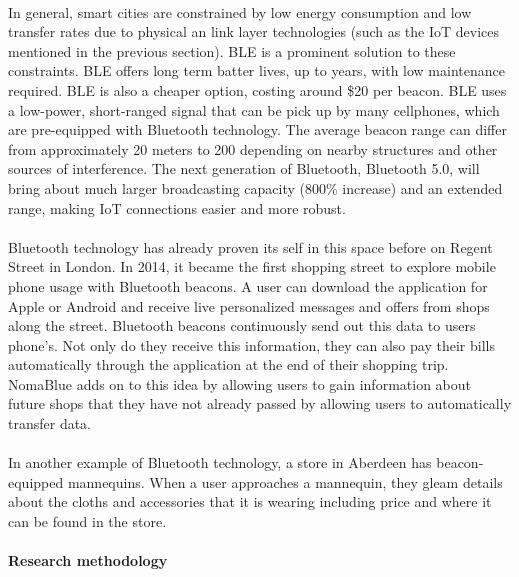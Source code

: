 \documentclass[a4paper,12pt]{article}
\begin{document}
\paragraph{}
In general, smart cities are constrained by low energy consumption and low transfer rates due to physical an link layer technologies (such as the IoT devices mentioned in the previous section). BLE is a prominent solution to these constraints. BLE offers long term batter lives, up to years, with low maintenance required. BLE is also a cheaper option, costing around \$20 per beacon. BLE uses a low-power, short-ranged signal that can be pick up by many cellphones, which are pre-equipped with Bluetooth technology. The average beacon range can differ from approximately 20 meters to 200 depending on nearby structures and other sources of interference. The next generation of Bluetooth, Bluetooth 5.0, will bring about much larger broadcasting capacity (800\% increase) and an extended range, making IoT connections easier and more robust.
\paragraph{}
Bluetooth technology has already proven its self in this space before on Regent Street in London. In 2014, it became the first shopping street to explore mobile phone usage with Bluetooth beacons. A user can download the application for Apple or Android and receive live personalized messages and offers from shops along the street. Bluetooth beacons continuously send out this data to users phone's. Not only do they receive this information, they can also pay their bills automatically through the application at the end of their shopping trip. NomaBlue adds on to this idea by allowing users to gain information about future shops that they have not already passed by allowing users to automatically transfer data.
\paragraph{}
In another example of Bluetooth technology, a store in Aberdeen has beacon-equipped mannequins. When a user approaches a mannequin, they gleam details about the cloths and accessories that it is wearing including price and where it can be found in the store.
\paragraph{Research methodology}












\medskip
\newpage

\end{document}
